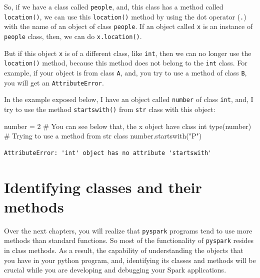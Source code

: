 \documentclass[
  11pt,
  letterpaper,
  DIV=11,
  numbers=noendperiod]{scrreprt}
\newenvironment{Shaded}{\begin{snugshade}}{\end{snugshade}}
\newcommand{\BuiltInTok}[1]{\textcolor[rgb]{0.00,0.23,0.31}{#1}}
\newcommand{\CommentTok}[1]{\textcolor[rgb]{0.37,0.37,0.37}{#1}}
\newcommand{\DecValTok}[1]{\textcolor[rgb]{0.68,0.00,0.00}{#1}}
\newcommand{\NormalTok}[1]{\textcolor[rgb]{0.00,0.23,0.31}{#1}}
\newcommand{\OperatorTok}[1]{\textcolor[rgb]{0.37,0.37,0.37}{#1}}
\newcommand{\StringTok}[1]{\textcolor[rgb]{0.13,0.47,0.30}{#1}}
\begin{document}
So, if we have a class called \texttt{people}, and, this class has a
method called \texttt{location()}, we can use this \texttt{location()}
method by using the dot operator (\texttt{.}) with the name of an object
of class \texttt{people}. If an object called \texttt{x} is an instance
of \texttt{people} class, then, we can do \texttt{x.location()}.

But if this object \texttt{x} is of a different class, like
\texttt{int}, then we can no longer use the \texttt{location()} method,
because this method does not belong to the \texttt{int} class. For
example, if your object is from class \texttt{A}, and, you try to use a
method of class \texttt{B}, you will get an \texttt{AttributeError}.

In the example exposed below, I have an object called \texttt{number} of
class \texttt{int}, and, I try to use the method \texttt{startswith()}
from \texttt{str} class with this object:

\begin{Shaded}
\begin{Highlighting}[]
\NormalTok{number }\OperatorTok{=} \DecValTok{2}
\CommentTok{\# You can see below that, the \textasciigrave{}x\textasciigrave{} object have class \textasciigrave{}int\textasciigrave{}}
\BuiltInTok{type}\NormalTok{(number)}
\CommentTok{\# Trying to use a method from \textasciigrave{}str\textasciigrave{} class}
\NormalTok{number.startswith(}\StringTok{"P"}\NormalTok{)}
\end{Highlighting}
\end{Shaded}

\begin{verbatim}
AttributeError: 'int' object has no attribute 'startswith'
\end{verbatim}

\hypertarget{identifying-classes-and-their-methods}{%
\section{Identifying classes and their
methods}\label{identifying-classes-and-their-methods}}

Over the next chapters, you will realize that \texttt{pyspark} programs
tend to use more methods than standard functions. So most of the
functionality of \texttt{pyspark} resides in class methods. As a result,
the capability of understanding the objects that you have in your python
program, and, identifying its classes and methods will be crucial while
you are developing and debugging your Spark applications.
\end{document}
